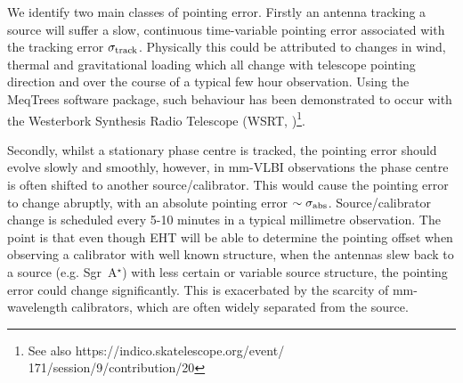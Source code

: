 
We identify two main classes of pointing error. Firstly an antenna tracking a source will suffer a slow, continuous time-variable pointing error associated with the tracking error $\sigma_{\rm track}$. Physically this could be attributed to changes in wind, thermal and gravitational loading which all change with telescope pointing direction and over the course of a typical few hour observation. Using the MeqTrees software package, such behaviour has been demonstrated to occur with the Westerbork Synthesis Radio Telescope (WSRT, \cite{Smirnov_2011c})\footnote{See also https://indico.skatelescope.org/event/\\171/session/9/contribution/20}.


Secondly, whilst a stationary phase centre is tracked, the pointing error should evolve slowly and smoothly, however, in mm-VLBI observations the phase centre is often shifted to another source/calibrator. This would cause the pointing error to change abruptly, with an absolute pointing error $\sim \sigma_{\rm abs}$. Source/calibrator change is scheduled every 5-10 minutes in a typical millimetre observation. The point is that even though EHT will be able to determine the pointing offset when observing a calibrator with well known structure, when the antennas slew back to a source (e.g. Sgr~A$^\star$) with less certain or variable source structure, the pointing error could change significantly. This is exacerbated by the scarcity of mm-wavelength calibrators, which are often widely separated from the source.
